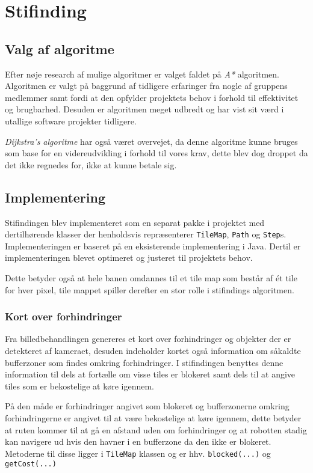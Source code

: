 \chapter{Stifinding}

\section{Valg af algoritme}
Efter nøje research af mulige algoritmer er valget faldet på \textit{A*} algoritmen.
Algoritmen er valgt på baggrund af tidligere erfaringer fra nogle af gruppens medlemmer samt fordi at den opfylder projektets behov i forhold til effektivitet og brugbarhed. Desuden er algoritmen meget udbredt og har vist sit værd i utallige software projekter tidligere.

\textit{Dijkstra's algoritme} har også været overvejet, da denne algoritme kunne bruges som base for en videreudvikling i forhold til vores krav, dette blev dog droppet da det ikke regnedes for, ikke at kunne betale sig.

\section{Implementering}
Stifindingen blev implementeret som en separat pakke i projektet med dertilhørende klasser der henholdsvis repræsenterer \texttt{TileMap}, \texttt{Path} og \texttt{Step}s. Implementeringen er baseret på en eksisterende implementering i Java. \cite{astar} 
Dertil er implementeringen blevet optimeret og justeret til projektets behov.

Dette betyder også at hele banen omdannes til et tile map som består af ét tile for hver pixel, tile mappet spiller derefter en stor rolle i stifindings algoritmen.

\subsection{Kort over forhindringer}
Fra billedbehandlingen genereres et kort over forhindringer og objekter der er detekteret af kameraet, desuden indeholder kortet også information om såkaldte bufferzoner som findes omkring forhindringer. I stifindingen benyttes denne information til dels at fortælle om visse tiles er blokeret samt dels til at angive tiles som er bekostelige at køre igennem.

På den måde er forhindringer angivet som blokeret og bufferzonerne omkring forhindringerne er angivet til at være bekostelige at køre igennem, dette betyder at ruten kommer til at gå en afstand uden om forhindringer og at robotten stadig kan navigere ud hvis den havner i en bufferzone da den ikke er blokeret. Metoderne til disse ligger i \texttt{TileMap} klassen og er hhv. \texttt{blocked(...)} og \texttt{getCost(...)}

